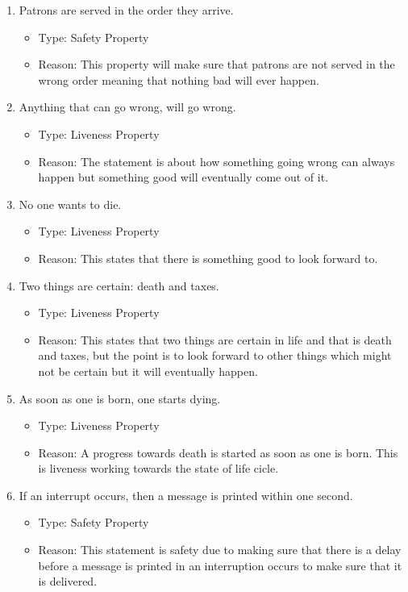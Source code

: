 \documentclass{article}
\begin{document}
\begin{enumerate}
    \item Patrons are served in the order they arrive.
    \begin{itemize}
        \item Type: Safety Property
        \item Reason: This property will make sure that patrons are not served in the wrong order meaning that nothing bad will ever happen.
    \end{itemize}

    \item Anything that can go wrong, will go wrong.
    \begin{itemize}
        \item Type: Liveness Property
        \item Reason: The statement is about how something going wrong can always happen but something good will eventually come out of it.
    \end{itemize}

    \item No one wants to die.
    \begin{itemize}
        \item Type: Liveness Property
        \item Reason: This states that there is something good to look forward to.
    \end{itemize}

    \item Two things are certain: death and taxes.
    \begin{itemize}
        \item Type: Liveness Property
        \item Reason: This states that two things are certain in life and that is death and taxes, but the point is to look forward to other things which might not be certain but it will eventually happen.
    \end{itemize}

    \item As soon as one is born, one starts dying.
    \begin{itemize}
        \item Type: Liveness Property
        \item Reason: A progress towards death is started as soon as one is born. This is liveness working towards the state of life cicle.
    \end{itemize}

    \item If an interrupt occurs, then a message is printed within one second.
    \begin{itemize}
        \item Type: Safety Property
        \item Reason: This statement is safety due to making sure that there is a delay before a message is printed in an interruption occurs to make sure that it is delivered.
    \end{itemize}


\end{enumerate}
\end{document}
